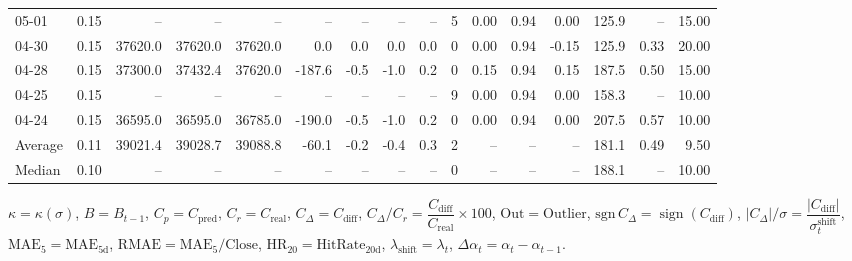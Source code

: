 \begin{threeparttable}
{\begin{tabular}{lrrrrrrrrrrrrrrr}
  05-01 &     0.15 &      -- &      -- &      -- &         -- &             -- &                       -- &                  -- &              5 &       0.00 &      0.94 &           0.00 &            125.9 &              -- &                  15.00 \\
  04-30 &     0.15 & 37620.0 & 37620.0 & 37620.0 &        0.0 &            0.0 &                      0.0 &                 0.0 &              0 &       0.00 &      0.94 &          -0.15 &            125.9 &            0.33 &                  20.00 \\
  04-28 &     0.15 & 37300.0 & 37432.4 & 37620.0 &     -187.6 &           -0.5 &                     -1.0 &                 0.2 &              0 &       0.15 &      0.94 &           0.15 &            187.5 &            0.50 &                  15.00 \\
  04-25 &     0.15 &      -- &      -- &      -- &         -- &             -- &                       -- &                  -- &              9 &       0.00 &      0.94 &           0.00 &            158.3 &              -- &                  10.00 \\
  04-24 &     0.15 & 36595.0 & 36595.0 & 36785.0 &     -190.0 &           -0.5 &                     -1.0 &                 0.2 &              0 &       0.00 &      0.94 &           0.00 &            207.5 &            0.57 &                  10.00 \\
Average &     0.11 & 39021.4 & 39028.7 & 39088.8 &      -60.1 &           -0.2 &                     -0.4 &                 0.3 &              2 &         -- &        -- &             -- &            181.1 &            0.49 &                   9.50 \\
 Median &     0.10 &      -- &      -- &      -- &         -- &             -- &                       -- &                  -- &              0 &         -- &        -- &             -- &            188.1 &              -- &                  10.00 \\
\bottomrule
\end{tabular}
}
\begin{tablenotes}\footnotesize
\item $\kappa=\kappa(\sigma)$, $B=B_{t-1}$, $C_p=C_{\text{pred}}$, $C_r=C_{\text{real}}$, $C_\Delta=C_{\text{diff}}$, $C_\Delta/C_r=\dfrac{C_{\text{diff}}}{C_{\text{real}}}\times100$, $\mathrm{Out}=\text{Outlier}$, $\mathrm{sgn}\,C_\Delta=\operatorname{sign}(C_{\text{diff}})$, $|C_\Delta|/\sigma=\dfrac{|C_{\text{diff}}|}{\sigma_t^{\text{shift}}}$, $\mathrm{MAE}_5=\mathrm{MAE}_{5\text{d}}$, $\mathrm{RMAE}= \mathrm{MAE}_5 / \text{Close}$, $\mathrm{HR}_{20}=\mathrm{HitRate}_{20\text{d}}$, 
$\lambda_{\text{shift}}=\lambda_t$, 
$\Delta\alpha_t=\alpha_t-\alpha_{t-1}$.
\end{tablenotes}
\end{threeparttable}
\endgroup

